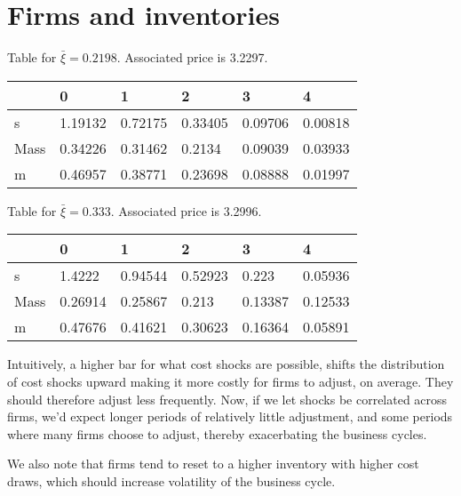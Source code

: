 \section{Firms and inventories}

Table for $\bar{\xi} = 0.2198$. Associated price is 3.2297.

\begin{table}[!ht]
    \centering
    \begin{tabular}{|l|l|l|l|l|l|}
    \hline
        ~ & 0 & 1 & 2 & 3 & 4 \\ \hline
        s & 1.19132 & 0.72175 & 0.33405 & 0.09706 & 0.00818 \\ \hline
        Mass & 0.34226 & 0.31462 & 0.2134 & 0.09039 & 0.03933 \\ \hline
        m & 0.46957 & 0.38771 & 0.23698 & 0.08888 & 0.01997 \\ \hline
    \end{tabular}
\end{table}

Table for $\bar{\xi} = 0.333$. Associated price is 3.2996.

\begin{table}[!ht]
    \centering
    \begin{tabular}{|l|l|l|l|l|l|}
    \hline
        ~ & 0 & 1 & 2 & 3 & 4 \\ \hline
        s & 1.4222 & 0.94544 & 0.52923 & 0.223 & 0.05936 \\ \hline
        Mass & 0.26914 & 0.25867 & 0.213 & 0.13387 & 0.12533 \\ \hline
        m & 0.47676 & 0.41621 & 0.30623 & 0.16364 & 0.05891 \\ \hline
    \end{tabular}
\end{table}

Intuitively, a higher bar for what cost shocks are possible, shifts the distribution of cost shocks upward making it more costly for firms to adjust, on average. They should therefore adjust less frequently. Now, if we let shocks be correlated across firms, we'd expect longer periods of relatively little adjustment, and some periods where many firms choose to adjust, thereby exacerbating the business cycles.

We also note that firms tend to reset to a higher inventory with higher cost draws, which should increase volatility of the business cycle. 




